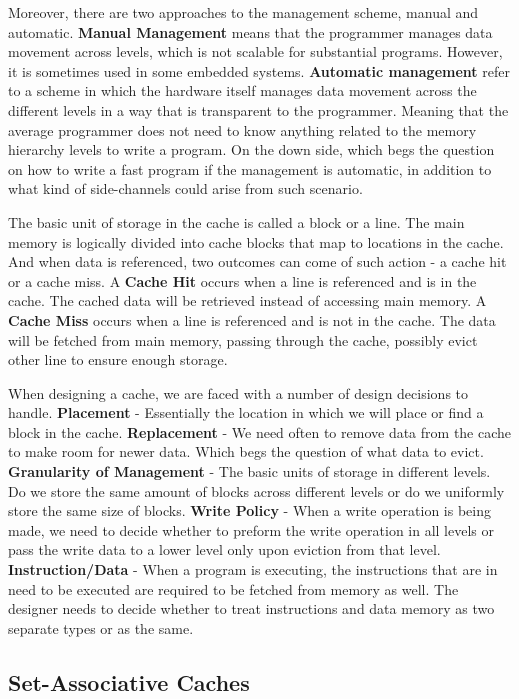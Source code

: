 Moreover, there are two approaches to the management scheme, manual and
automatic. \textbf{Manual Management} means that the programmer manages data
movement across levels, which is not scalable for substantial programs. However,
it is sometimes used in some embedded systems. \textbf{Automatic management}
refer to a scheme in which the hardware itself manages data movement across the
different levels in a way that is transparent to the programmer. Meaning that
the average programmer does not need to know anything related to the memory
hierarchy levels to write a program. On the down side, which begs the question
on how to write a fast program if the management is automatic, in addition to
what kind of side-channels could arise from such scenario.

The basic unit of storage in the cache is called a block or a line. The main
memory is logically divided into cache blocks that map to locations in the
cache. And when data is referenced, two outcomes can come of such action - a
cache hit or a cache miss. A \textbf{Cache Hit} occurs when a line is referenced
and is in the cache. The cached data will be retrieved instead of accessing main
memory.  A \textbf{Cache Miss} occurs when a line is referenced and is not in
the cache. The data will be fetched from main memory, passing through the cache,
possibly evict other line to ensure enough storage.

When designing a cache, we are faced with a number of design decisions to
handle. \textbf{Placement}  - Essentially the location in which we will place or
find a block in the cache. \textbf{Replacement} - We need often to remove data
from the cache to make room for newer data. Which begs the question of what data
to evict. \textbf{Granularity of Management} - The basic units of storage in
different levels. Do we store the same amount of blocks across different levels
or do we uniformly store the same size of blocks. \textbf{Write Policy} - When a
write operation is being made, we need to decide whether to preform the write operation in
all levels or pass the write data to a lower level only upon eviction from
that level. \textbf{Instruction/Data} - When a program is executing, the
instructions that are in need to be executed are required to be fetched from
memory as well. The designer needs to decide whether to treat instructions and
data memory as two separate  types or as the same.


\subsection{Set-Associative Caches}
\label{subsec:setassoccaches}

